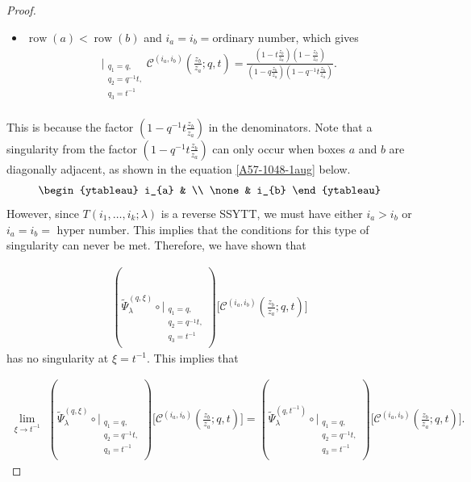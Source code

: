 \documentclass[12pt,reqno,a4paper]{amsart}
\newcommand{\comp}{\circ}
\newcommand{\cals}[1]{\mathcal{#1}}
\numberwithin{equation}{section}
\newcommand{\dualmap}{
\widetilde{\Psi}^{(q,\xi)}_{\lambda}
}
\theoremstyle{definition}
\begin{document}
\begin{proof}
\begin{itemize}
\begin{align}
{			\left(1 - t^{-1}\frac{z_b}{z_a}\right)
		}, 
	\end{align}
	\normalsize
	\item 
	$\operatorname{row}(a) < \operatorname{row}(b)$ and $i_a = i_b = \text{ordinary number}$, which gives 
	\footnotesize
	\begin{align}
		\bigg|_{
			\substack{
				q_1 = q, \\
				q_2 = q^{-1}t,\\
				q_3 = t^{-1} \\
			}
		}
		\cals{C}^{(i_a,i_b)}\left(
		\frac{z_b}{z_a}
		; q, t
		\right)
		= 
		\frac{
			\left(1 - t\frac{z_b}{z_a}\right)
			\left(1 - \frac{z_b}{z_a}\right)
		}{
			\left(1 - q\frac{z_b}{z_a}\right)
			\left(1 - q^{-1}t\frac{z_b}{z_a}\right)
		}. 
	\end{align}
	\normalsize
\end{itemize}
This is because the factor $\left(1 - q^{-1}t\frac{z_b}{z_a}\right)$ in the denominators. Note that a singularity from the factor $\left(1 - q^{-1}t\frac{z_b}{z_a}\right)$ can only occur when boxes $a$ and $b$ are diagonally adjacent, as shown in the equation \eqref{A57-1048-1aug} below. 
\begin{align}
	\begin{ytableau}
		i_{a}  &   \\
		\none & i_{b}
	\end{ytableau}
\label{A57-1048-1aug}
\end{align}
However, since $T(i_1,\dots,i_k;\lambda)$ is a reverse SSYTT, we must have either 
$i_a > i_b$ or $i_a = i_b = \text{ hyper number}$. This implies that the conditions for this type of singularity can never be met. Therefore, we have shown that 

\footnotesize
\begin{align}
	(
	\dualmap
	\comp 
	\bigg|_{
		\substack{
			q_1 = q, \\
			q_2 = q^{-1}t,\\
			q_3 = t^{-1} \\
		}
	}
	)
	\Big[
	\cals{C}^{(i_a,i_b)}\left(
	\frac{z_b}{z_a}
	; q, t
	\right)
	\Big]
\end{align}
\normalsize
has no singularity at $\xi = t^{-1}$. This implies that 

\footnotesize
\begin{align}
	\lim_{\xi \rightarrow t^{-1}}\,\,
	(
	\dualmap
	\comp 
	\bigg|_{
		\substack{
			q_1 = q, \\
			q_2 = q^{-1}t,\\
			q_3 = t^{-1} \\
		}
	}
	)
	\Big[
	\cals{C}^{(i_a,i_b)}\left(
	\frac{z_b}{z_a}
	; q, t
	\right)
	\Big]
	=
	(
	\widetilde{\Psi}_{\lambda}^{(q,t^{-1})}
	\comp 
	\bigg|_{
		\substack{
			q_1 = q, \\
			q_2 = q^{-1}t,\\
			q_3 = t^{-1} \\
		}
	}
	)
	\Big[
	\cals{C}^{(i_a,i_b)}\left(
	\frac{z_b}{z_a}
	; q, t
	\right)
	\Big]. 
\end{align}
\normalsize
\end{proof}
\end{document}
